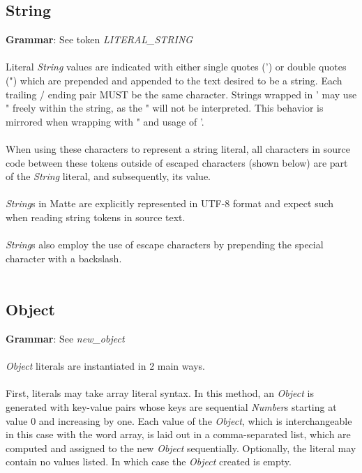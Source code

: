 \documentclass[12pt,letterpaper]{report}
\begin{document}
\subsection{String}\label{StringLiterals}

\textbf{Grammar}: See token \textit{LITERAL\_STRING}
\\\\
Literal \textit{String} values are indicated with either single quotes (') or double quotes (")
which are prepended and appended to the text desired to be a string. Each trailing /
ending pair MUST be the same character. Strings wrapped in ' may use " freely within 
the string, as the " will not be interpreted. This behavior is mirrored when wrapping with " and usage of '.
\\\\
When using these characters to represent a string literal, all characters in source code between these tokens 
outside of escaped characters (shown below) are part of the \textit{String} literal, and subsequently, 
its value.
\\\\
\textit{String}s in Matte are explicitly represented in UTF-8 format and expect such 
when reading string tokens in source text.
\\\\
\textit{String}s also employ the use of escape characters by prepending the special 
character with a backslash.
\\\\




\subsection{Object}\label{ObjectLiterals}


\textbf{Grammar}: See \textit{new\_object}
\\\\
\textit{Object} literals are instantiated in 2 main ways.
\\\\
First, literals may take array literal syntax. In this method, an \textit{Object} is generated with 
key-value pairs whose keys are sequential \textit{Number}s starting at value 0 and increasing by one.
Each value of the \textit{Object}, which is interchangeable in this case with the word array,
is laid out in a comma-separated list, which are computed and assigned to the new \textit{Object} sequentially.
Optionally, the literal may contain no values listed. In which case the \textit{Object} created is empty.
\end{document}
